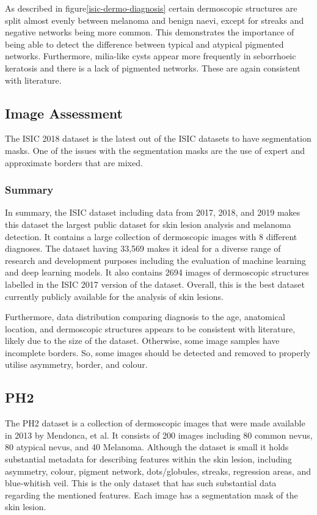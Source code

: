 As described in figure\ref{isic-dermo-diagnosis} certain dermoscopic structures are split almost evenly between melanoma and benign naevi, except for streaks and negative networks being more common. This demonstrates the importance of being able to detect the difference between typical and atypical pigmented networks. Furthermore, milia-like cysts appear more frequently in seborrhoeic keratosis and there is a lack of pigmented networks. These are again consistent with literature.


\subsection{Image Assessment}
The ISIC 2018 dataset is the latest out of the ISIC datasets to have segmentation masks. One of the issues with the segmentation masks are the use of expert and approximate borders that are mixed.




\subsubsection{Summary}
In summary, the ISIC dataset including data from 2017, 2018, and 2019 makes this dataset the largest public dataset for skin lesion analysis and melanoma detection. It contains a large collection of dermoscopic images with 8 different diagnoses. The dataset having 33,569 makes it ideal for a diverse range of research and development purposes including the evaluation of machine learning and deep learning models. It also contains 2694 images of dermoscopic structures labelled in the ISIC 2017 version of the dataset. Overall, this is the best dataset currently publicly available for the analysis of skin lesions.

Furthermore, data distribution comparing diagnosis to the age, anatomical location, and dermoscopic structures appears to be consistent with literature\cite{}, likely due to the size of the dataset. Otherwise, some image samples have incomplete borders. So, some images should be detected and removed to properly utilise asymmetry, border, and colour.

\subsection{PH2}
The PH2 dataset is a collection of dermoscopic images that were made available in 2013 by Mendonca, et al\cite{}. It consists of 200 images including 80 common nevus, 80 atypical nevus, and 40 Melanoma. Although the dataset is small it holds substantial metadata for describing features within the skin lesion, including asymmetry, colour, pigment network, dots/globules, streaks, regression areas, and blue-whitish veil. This is the only dataset that has such substantial data regarding the mentioned features. Each image has a segmentation mask of the skin lesion.


